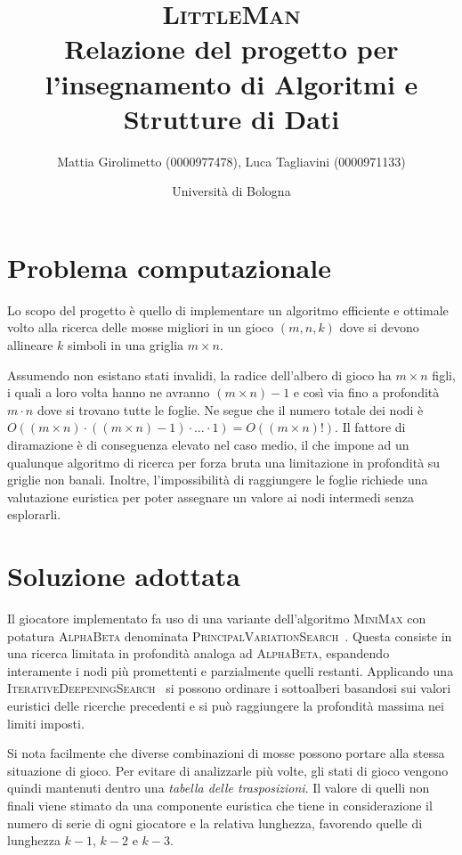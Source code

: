 \documentclass{article}
\title{\textsc{LittleMan}\\
\large Relazione del progetto per l'insegnamento di Algoritmi e Strutture di Dati}
\author{
  Mattia Girolimetto (0000977478),
  Luca Tagliavini (0000971133)
}
\date{
	Universit\`a di Bologna \\
  \displaydate{date}
}
\begin{document}
\maketitle
\pagebreak
\tableofcontents
\pagebreak

\section{Problema computazionale}

Lo scopo del progetto \`e quello di implementare un algoritmo efficiente e ottimale
volto alla ricerca delle mosse migliori in un gioco $(m,n,k)$ dove si devono
allineare $k$ simboli in una griglia $m \times n$.

Assumendo non esistano stati invalidi, la radice dell'albero di gioco
ha $m \times n$ figli, i quali a loro volta hanno ne avranno $(m \times n)-1$
e cos\`i via fino a profondit\`a $m \cdot n$ dove si trovano tutte le foglie.
Ne segue che il numero totale dei nodi \`e $O((m \times n) \cdot ((m \times n)-1)
\cdot \ldots \cdot 1) = O((m \times n)!)$.
Il fattore di diramazione \`e di conseguenza elevato nel caso medio, il che
impone ad un qualunque algoritmo di ricerca per forza bruta una limitazione in
profondit\`a su griglie non banali. Inoltre, l'impossibilit\`a di raggiungere
le foglie richiede una valutazione euristica per poter assegnare un valore
ai nodi intermedi senza esplorarli.

\section{Soluzione adottata}

Il giocatore implementato fa uso di una variante dell'algoritmo \textsc{MiniMax} con potatura
\textsc{AlphaBeta} denominata \textsc{PrincipalVariationSearch}~\cite{negascout}. Questa
consiste in una ricerca limitata in profondit\`a analoga ad \textsc{AlphaBeta}, espandendo 
interamente i nodi pi\`u promettenti e parzialmente quelli restanti. Applicando
una \textsc{IterativeDeepeningSearch}~\cite{id} si possono ordinare i sottoalberi
basandosi sui valori euristici delle ricerche precedenti e si pu\`o raggiungere
la profondit\`a massima nei limiti imposti.

Si nota facilmente che diverse combinazioni di mosse possono portare alla stessa 
situazione di gioco.
Per evitare di analizzarle pi\`u volte, gli stati di gioco vengono quindi mantenuti 
dentro una \emph{tabella delle trasposizioni}. Il valore di quelli non finali
viene stimato da una componente euristica che tiene in considerazione il numero
di serie di ogni giocatore e la relativa lunghezza, favorendo quelle di lunghezza
$k-1$, $k-2$ e $k-3$.
\end{document}
